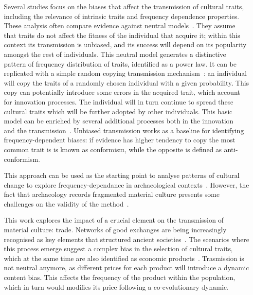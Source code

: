 \documentclass{wscpaperproc}
\begin{document}
Several studies focus on the biases that affect the transmission of cultural traits, including the relevance of intrinsic traits and frequency dependence properties. These analysis often compare evidence against neutral models~. They assume that traits do not affect the fitness of the individual that acquire it; within this context its transmission is unbiased, and its success will depend on its popularity amongst the rest of individuals. This neutral model generates a distinctive pattern of frequency distribution of traits, identified as a power law. It can be replicated with a simple random copying transmission mechanism~: an individual will copy the traits of a randomly chosen individual with a given probability. This copy can potentially introduce some errors in the acquired trait, which account for innovation processes. The individual will in turn continue to spread these cultural traits which will be further adopted by other individuals. This basic model can be enriched by several additional processes both in the innovation~ and the transmission~. Unbiased transmission works as a baseline for identifying frequency-dependent biases: if evidence has higher tendency to copy the most common trait is is known as conformism, while the opposite is defined as anti-conformism.

This approach can be used as the starting point to analyse patterns of cultural change to explore frequency-dependance in archaeological contexts~. However, the fact that archaeology records fragmented material culture presents some challenges on the validity of the method~.

This work explores the impact of a crucial element on the transmission of material culture: trade. Networks of good exchanges are being increasingly recognised as key elements that structured ancient societies~. The scenarios where this process emerge suggest a complex bias in the selection of cultural traits, which at the same time are also identified as economic products~. Trasmission is not neutral anymore, as different prices for each product will introduce a dynamic content bias. This affects the frequency of the product within the population, which in turn would modifies its price following a co-evolutionary dynamic.
\end{document}
